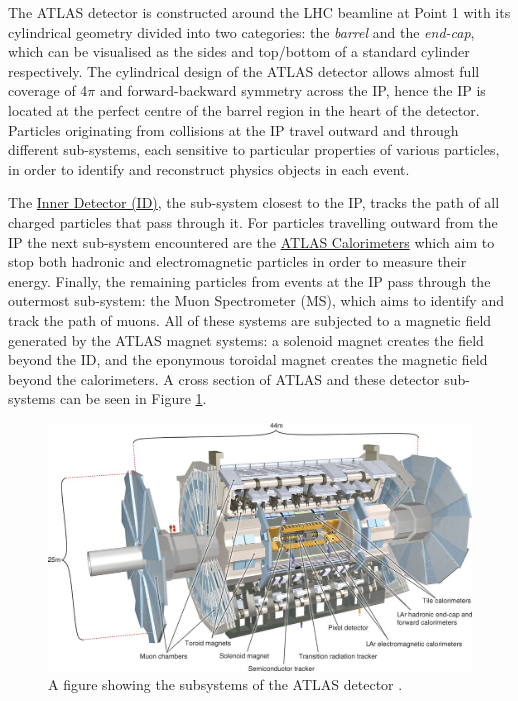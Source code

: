 \documentclass[12pt,a4paper,epsf,portrait,times,epsfig]{report}
\begin{document}
		The ATLAS detector is constructed around the LHC beamline at Point 1 with its cylindrical geometry divided into two categories: the \textit{barrel} and the \textit{end-cap}, which can be visualised as the sides and top/bottom of a standard cylinder respectively. The cylindrical design of the ATLAS detector allows almost full coverage of 4$\pi$ and forward-backward symmetry across the IP, hence the IP is located at the perfect centre of the barrel region in the heart of the detector. Particles originating from collisions at the IP travel outward and through different sub-systems, each sensitive to particular properties of various particles, in order to identify and reconstruct physics objects in each event. \par 


		The \hyperref[Section:InnerDetector]{Inner Detector (ID)}, the sub-system closest to the IP, tracks the path of all charged particles that pass through it. For particles travelling outward from the IP the next sub-system encountered are the \hyperref[Section:Calorimeters]{ATLAS Calorimeters} which aim to stop both hadronic and electromagnetic particles in order to measure their energy. Finally, the remaining particles from events at the IP pass through the outermost sub-system: the Muon Spectrometer (MS), which aims to identify and track the path of muons. All of these systems are subjected to a magnetic field generated by the ATLAS magnet systems: a solenoid magnet creates the field beyond the ID, and the eponymous toroidal magnet creates the magnetic field beyond the calorimeters. A cross section of ATLAS and these detector sub-systems can be seen in Figure \ref{Fig:ATLASDetector}.

		\begin{figure}
			\centering
			\includegraphics{ATLAS}
			\caption{A figure showing the subsystems of the ATLAS detector \cite{Article:ATLASDesignPaper}.}
			\label{Fig:ATLASDetector}
		\end{figure}
\end{document}
